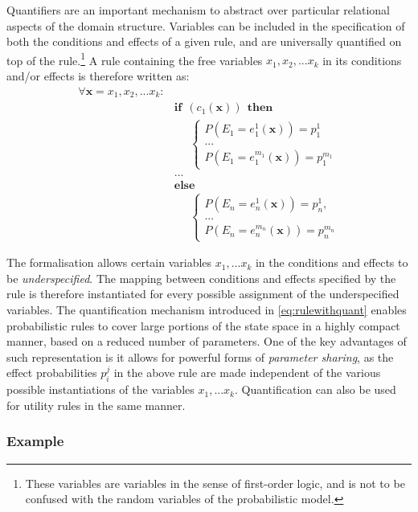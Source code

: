 Quantifiers are an important mechanism to abstract over particular relational aspects of the domain structure.  Variables can be included in the specification of both the conditions and effects of a given rule, and are universally quantified on top of the rule.\footnote{These variables are variables in the sense of first-order logic, and is not to be confused with the random variables of the probabilistic model.}  A rule containing the free variables $x_1,x_2,...x_k$ in its conditions and/or effects is therefore written as:
\begin{equation}
\begin{aligned}
\forall \mathbf{x} = x_1, x_2,...x_k: \\
& \textbf{if} \ \ (c_{1}(\mathbf{x})) \ \ \textbf{then} \\ 
& \;\;\;\;\; \begin{cases}
P(E_1\!=\!e_1^1(\mathbf{x})) = p_1^1 \\
 ... \\
P(E_1\!=\!e_1^{m_1}(\mathbf{x})) = p_1^{m_1} 
\end{cases} \\ 
& ...  \\
& \textbf{else} \\
& \;\;\;\;\; \begin{cases}
P(E_n\!=\!e_n^1(\mathbf{x})) = p_n^1, \\
... \\
P(E_n\!=\!e_n^{m_n}(\mathbf{x})) = p_n^{m_n}
\end{cases}
\end{aligned}
\label{eq:rulewithquant}
\end{equation}

The formalisation allows certain variables $x_1,...x_k$ in the conditions and effects to be \textit{underspecified}.  The mapping between conditions and effects specified by the rule is therefore instantiated for every possible assignment of the underspecified variables. The quantification mechanism introduced in \eqref{eq:rulewithquant} enables probabilistic rules to cover large portions of the state space in a highly compact manner, based on a reduced number of parameters. One of the key advantages of such representation is it allows for powerful forms of \textit{parameter sharing}, as the effect probabilities $p_i^j$ in the above rule are made independent of the various possible instantiations of the variables $x_1,...x_k$. Quantification can also be used for utility rules in the same manner. 

\subsubsection*{Example}

